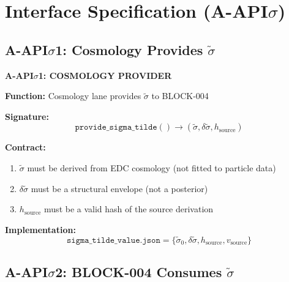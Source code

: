 \documentclass[11pt,letterpaper]{article}
\newcommand{\st}{\tilde{\sigma}}
\begin{document}
\section{Interface Specification (A-API$\sigma$)}
\label{sec:interface-spec}

\subsection{A-API$\sigma$1: Cosmology Provides $\st$}
\label{subsec:api-sigma1}

\begin{apibox}
\textbf{A-API$\sigma$1: COSMOLOGY PROVIDER}

\textbf{Function:} Cosmology lane provides $\st$ to BLOCK-004

\textbf{Signature:}
\begin{equation}
\texttt{provide\_sigma\_tilde}() \to (\st, \delta\st, h_{\text{source}})
\label{eq:api-sigma1}
\end{equation}

\textbf{Contract:}
\begin{enumerate}[noitemsep]
\item $\st$ must be derived from EDC cosmology (not fitted to particle data)
\item $\delta\st$ must be a structural envelope (not a posterior)
\item $h_{\text{source}}$ must be a valid hash of the source derivation
\end{enumerate}

\textbf{Implementation:}
\begin{equation}
\texttt{sigma\_tilde\_value.json} = \{ \st_0, \delta\st, h_{\text{source}}, v_{\text{source}} \}
\label{eq:api-sigma1-impl}
\end{equation}
\end{apibox}

\subsection{A-API$\sigma$2: BLOCK-004 Consumes $\st$}
\label{subsec:api-sigma2}
\end{document}
